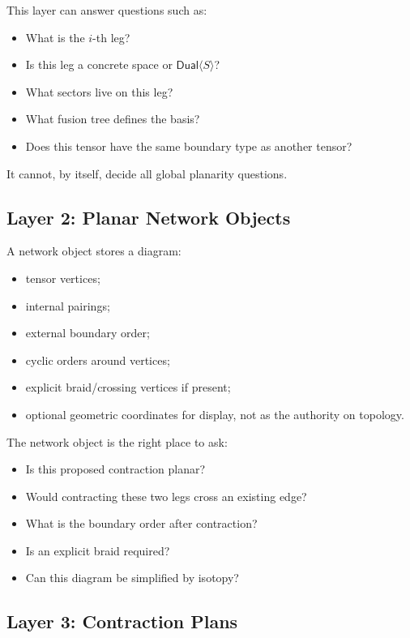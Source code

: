 \documentclass[11pt]{article}
\newcommand{\Dual}{\mathsf{Dual}}
\begin{document}
This layer can answer questions such as:

\begin{itemize}[nosep]
  \item What is the \(i\)-th leg?
  \item Is this leg a concrete space or \(\Dual\langle S\rangle\)?
  \item What sectors live on this leg?
  \item What fusion tree defines the basis?
  \item Does this tensor have the same boundary type as another tensor?
\end{itemize}

It cannot, by itself, decide all global planarity questions.

\subsection{Layer 2: Planar Network Objects}

A network object stores a diagram:

\begin{itemize}
  \item tensor vertices;
  \item internal pairings;
  \item external boundary order;
  \item cyclic orders around vertices;
  \item explicit braid/crossing vertices if present;
  \item optional geometric coordinates for display, not as the
        authority on topology.
\end{itemize}

The network object is the right place to ask:

\begin{itemize}[nosep]
  \item Is this proposed contraction planar?
  \item Would contracting these two legs cross an existing edge?
  \item What is the boundary order after contraction?
  \item Is an explicit braid required?
  \item Can this diagram be simplified by isotopy?
\end{itemize}

\subsection{Layer 3: Contraction Plans}
\end{document}
